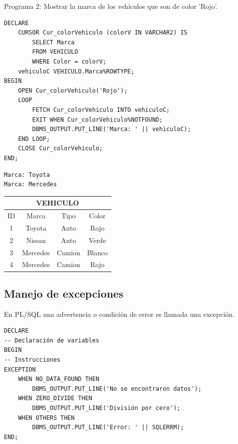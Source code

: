 \documentclass{templateNote}
\begin{document}
\newpage
Programa 2: Mostrar la marca de los vehículos que son de color 'Rojo'.
\begin{tcolorbox}[
    colframe=Morado!100, %
    colback=Morado!20,       %
    coltitle=white!100, %
    title=\textbf{PL/SQL}, %
]
    \begin{verbatim}
DECLARE
    CURSOR Cur_colorVehiculo (colorV IN VARCHAR2) IS
        SELECT Marca
        FROM VEHICULO
        WHERE Color = colorV;
    vehiculoC VEHICULO.Marca%ROWTYPE;
BEGIN
    OPEN Cur_colorVehiculo('Rojo');
    LOOP
        FETCH Cur_colorVehiculo INTO vehiculoC;
        EXIT WHEN Cur_colorVehiculo%NOTFOUND;
        DBMS_OUTPUT.PUT_LINE('Marca: ' || vehiculoC);
    END LOOP;
    CLOSE Cur_colorVehiculo;
END;
    \end{verbatim}
\end{tcolorbox}
\begin{tcolorbox}[
    colframe=Morado!100, %
    colback=Morado!20,       %
    coltitle=white!100, %
    title=\textbf{Resultado}, %
]
    \begin{verbatim}
Marca: Toyota
Marca: Mercedes
    \end{verbatim}
\end{tcolorbox}
\begin{center}
    \begin{tabular}{|c|c|c|c|}
        \hline
        \multicolumn{4}{|c|}{VEHICULO} \\ \hline
        ID & Marca & Tipo & Color \\
        \hline
        \rowcolor{red} 1 & Toyota & Auto & Rojo \\
        2 & Nissan & Auto & Verde \\
        3 & Mercedes & Camion & Blanco \\
        \rowcolor{red}4 & Mercedes & Camion & Rojo \\
        \hline
    \end{tabular}
\end{center}

\newpage
\subsection{Manejo de excepciones}
\indent
En PL/SQL una advertencia o condición de error es llamada una excepción.\\

\begin{tcolorbox}[
    colframe=Salmon!100, %
    colback=Salmon!20,       %
    coltitle=black!100, %
    title=\textbf{PL/SQL}, %
]
    \begin{verbatim}
DECLARE
-- Declaración de variables
BEGIN
-- Instrucciones
EXCEPTION
    WHEN NO_DATA_FOUND THEN
        DBMS_OUTPUT.PUT_LINE('No se encontraron datos');
    WHEN ZERO_DIVIDE THEN
        DBMS_OUTPUT.PUT_LINE('División por cero');
    WHEN OTHERS THEN
        DBMS_OUTPUT.PUT_LINE('Error: ' || SQLERRM);
END;
    \end{verbatim}
\end{tcolorbox}
\end{document}
